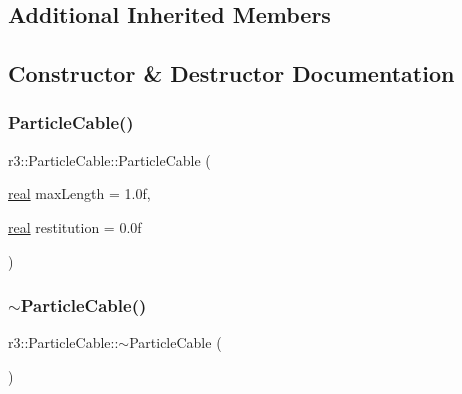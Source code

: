 \subsection*{Additional Inherited Members}


\subsection{Constructor \& Destructor Documentation}
\mbox{\label{classr3_1_1_particle_cable_afcb568750f7430ec94e34942f766e087}} 
\subsubsection{\texorpdfstring{Particle\+Cable()}{ParticleCable()}}
{\footnotesize\ttfamily r3\+::\+Particle\+Cable\+::\+Particle\+Cable (\begin{DoxyParamCaption}\item[{\mbox{\hyperlink{namespacer3_ab2016b3e3f743fb735afce242f0dc1eb}{real}}}]{max\+Length = {\ttfamily 1.0f},  }\item[{\mbox{\hyperlink{namespacer3_ab2016b3e3f743fb735afce242f0dc1eb}{real}}}]{restitution = {\ttfamily 0.0f} }\end{DoxyParamCaption})\hspace{0.3cm}{\ttfamily [explicit]}}

\mbox{\label{classr3_1_1_particle_cable_a4ba107749641635a5d7b670eab78c371}} 
\subsubsection{\texorpdfstring{$\sim$\+Particle\+Cable()}{~ParticleCable()}}
{\footnotesize\ttfamily r3\+::\+Particle\+Cable\+::$\sim$\+Particle\+Cable (\begin{DoxyParamCaption}{ }\end{DoxyParamCaption})\hspace{0.3cm}{\ttfamily [default]}}



